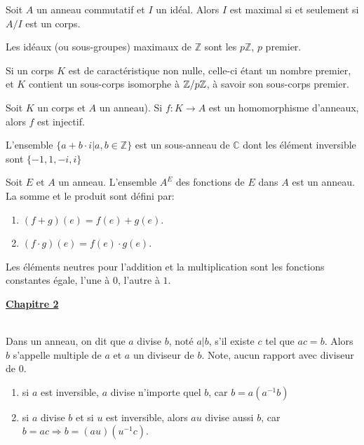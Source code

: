 \documentclass[12pt,a4paper]{article}
\begin{document}
\begin{flushleft}
\begin{prop}
Soit $A$ un anneau commutatif et $I$ un idéal. Alors $I$ est maximal si et seulement si $A/I$ est un corps.
\end{prop}

\begin{cor}
Les idéaux (ou sous-groupes) maximaux de $\mathbb{Z}$ sont les $p \mathbb{Z}$, $p$ premier.
\end{cor}

\begin{prop}
Si un corps $K$ est de caractéristique non nulle, celle-ci étant un nombre premier, et $K$ contient un sous-corps isomorphe à $\mathbb{Z} / p \mathbb{Z}$, à savoir son sous-corps premier.
\end{prop}

\begin{prop}
Soit $K$ un corps et $A$ un anneau). Si $f: K \rightarrow A$ est un homomorphisme d'anneaux, alors $f$ est injectif.
\end{prop}

\begin{prop}
L'ensemble $\{ a + b \cdot i| a, b \in \mathbb{Z} \} $ est un sous-anneau de $\mathbb{C}$ dont les élément inversible sont $\{-1, 1, -i, i \}$
\end{prop}

\begin{prop}
Soit $E$ et $A$ un anneau. L'ensemble $A^E$ des fonctions de $E$ dans $A$ est un anneau. La somme et le produit sont défini par: 
\begin{enumerate}
\item $(f+g)(e)= f(e) + g(e)$.
\item $(f \cdot g) (e) = f(e) \cdot g(e)$.
\end{enumerate}
Les éléments neutres pour l'addition et la multiplication sont les fonctions constantes égale, l'une à $0$, l'autre à $1$. 
\end{prop}


\textbf{\underline{Chapitre 2}}\\~\\

\begin{mydef}
Dans un anneau, on dit que $a$ divise $ b $, noté $ a | b $, s'il existe $ c $ tel que $ ac = b $. Alors $ b $ s'appelle multiple de $ a $ et $ a $ un diviseur de  $b $. Note, aucun rapport avec diviseur de $ 0 $.
\end{mydef}

\begin{rem}
\begin{enumerate}
\item si $ a $ est inversible, $ a $ divise n'importe quel $ b $, car $ b = a (a^{-1} b) $
\item si $ a $ divise $ b $ et si $ u $ est inversible, alors $ au $ divise aussi $ b $, car $b = ac \Rightarrow b = (au) (u^{-1} c)$.
\end{enumerate}
\end{rem}


\end{flushleft}
\end{document}
